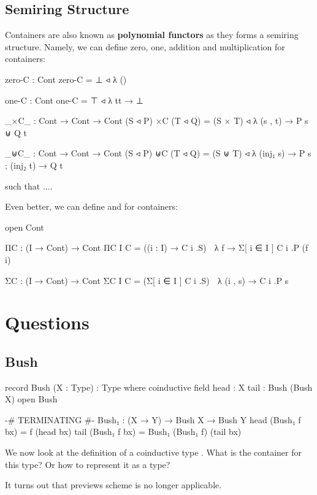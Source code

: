 \subsection{Semiring Structure}

Containers are also known as \textbf{polynomial functors} as they forms a semiring structure. Namely, we can define zero, one, addition and multiplication for containers:

\begin{code}
zero-C : Cont
zero-C = ⊥ ◃ λ ()

one-C : Cont
one-C = ⊤ ◃ λ{ tt → ⊥ }

_×C_ : Cont → Cont → Cont
(S ◃ P) ×C (T ◃ Q) = (S × T) ◃ λ (s , t) → P s ⊎ Q t

_⊎C_ : Cont → Cont → Cont
(S ◃ P) ⊎C (T ◃ Q) = (S ⊎ T) ◃ λ{ (inj₁ s) → P s ; (inj₂ t) → Q t }
\end{code}

such that ....

Even better, we can define  and  for containers:

\begin{code}[hide]
open Cont
\end{code}

\begin{code}
ΠC : (I → Cont) → Cont
ΠC {I} C⃗ = ((i : I) → C⃗ i .S) ◃ λ f → Σ[ i ∈ I ] C⃗ i .P (f i)

ΣC : (I → Cont) → Cont
ΣC {I} C⃗ = (Σ[ i ∈ I ] C⃗ i .S) ◃ λ (i , s) → C⃗ i .P s
\end{code}

\section{Questions}

\subsection{Bush}

\begin{code}
record Bush (X : Type) : Type where
  coinductive
  field
    head : X
    tail : Bush (Bush X)
open Bush    

{-# TERMINATING #-}
Bush₁ : (X → Y) → Bush X → Bush Y
head (Bush₁ f bx) = f (head bx)
tail (Bush₁ f bx) = Bush₁ (Bush₁ f) (tail bx)
\end{code}

We now look at the definition of a coinductive type . What is the container for this type? Or how to represent it as a  type?

It turns out that previews scheme is no longer applicable.